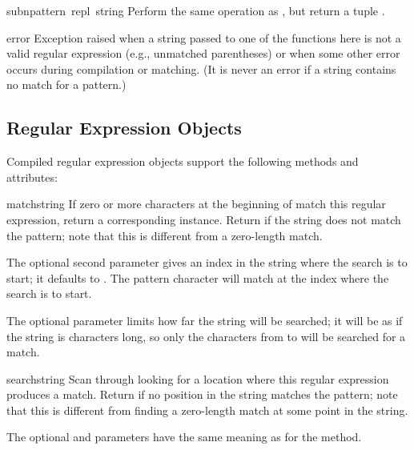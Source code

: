 \begin{funcdesc}{subn}{pattern\, repl\, string}
Perform the same operation as , but return a tuple
.
\end{funcdesc}

\begin{excdesc}{error}
  Exception raised when a string passed to one of the functions here
  is not a valid regular expression (e.g., unmatched parentheses) or
  when some other error occurs during compilation or matching.  (It is
  never an error if a string contains no match for a pattern.)
\end{excdesc}

\subsection{Regular Expression Objects}
Compiled regular expression objects support the following methods and
attributes:

\begin{funcdesc}{match}{string}
  If zero or more characters at the beginning of  match
  this regular expression, return a corresponding
   instance.  Return  if the string does not
  match the pattern; note that this is different from a zero-length
  match.
  
  The optional second parameter  gives an index in the string
  where the search is to start; it defaults to .  The
   pattern character will match at the index where the
  search is to start.

  The optional parameter  limits how far the string will
  be searched; it will be as if the string is  characters
  long, so only the characters from  to  will be
  searched for a match.
\end{funcdesc}

\begin{funcdesc}{search}{string}
  Scan through  looking for a location where this regular
  expression produces a match.  Return  if no
  position in the string matches the pattern; note that this is
  different from finding a zero-length match at some point in the string.
  
  The optional  and  parameters have the same
  meaning as for the  method.
\end{funcdesc}

